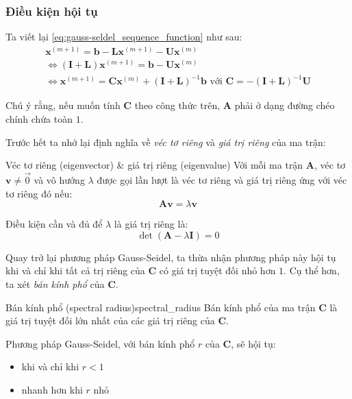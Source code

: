 \documentclass[../../Lectures]{subfiles}
\begin{document}
\subsubsection{Điều kiện hội tụ}

Ta viết lại \eqref{eq:gauss-seldel_sequence_function} như sau:
\begin{gather*}
    \bm{x}^{(m + 1)} = \bm{b} - \bm{L} \bm{x}^{(m + 1)} - \bm{U} \bm{x}^{(m)} \\
    \iff (\bm{I} + \bm{L})\bm{x}^{(m + 1)} = \bm{b} - \bm{U} \bm{x}^{(m)} \\
    \iff \bm{x}^{(m + 1)} = \bm{C} \bm{x}^{(m)} + (\bm{I} + \bm{L})^{-1} \bm{b} \text{ với } \bm{C} = -(\bm{I} + \bm{L})^{-1} \bm{U}
\end{gather*}

Chú ý rằng, nếu muốn tính \(\bm{C}\) theo công thức trên, \(\bm{A}\) phải ở dạng
đường chéo chính chứa toàn \(1\).

Trước hết ta nhớ lại định nghĩa về \emph{véc tơ riêng} và
\emph{giá trị riêng} của ma trận:

\begin{cdefinition}{Véc tơ riêng (eigenvector) \& giá trị riêng (eigenvalue)}{}
    Với mỗi ma trận \(\bm{A}\), véc tơ \(\bm{v} \neq \vec{0}\) và vô hướng
    \(\lambda\) được gọi lần lượt là véc tơ riêng và giá trị riêng ứng với véc
    tơ riêng đó nếu:
    \[\bm{Av} = \lambda \bm{v}\]

    Điều kiện cần và đủ để \(\lambda\) là giá trị riêng là:
    \[\det(\bm{A} - \lambda \bm{I}) = 0\]
\end{cdefinition}

Quay trở lại phương pháp Gauss-Seidel, ta thừa nhận phương pháp này hội tụ khi
và chỉ khi tất cả trị riêng của \(\bm{C}\) có giá trị tuyệt đối nhỏ hơn \(1\).
Cụ thể hơn, ta xét \emph{bán kính phổ} của \(\bm{C}\).

\begin{cdefinition}{Bán kính phổ (spectral radius)}{spectral_radius}
    Bán kính phổ của ma trận \(\bm{C}\) là giá trị tuyệt đối lớn nhất của các
    giá trị riêng của \(\bm{C}\).
\end{cdefinition}

Phương pháp Gauss-Seidel, với bán kính phổ \(r\) của \(\bm{C}\), sẽ hội tụ:
\begin{itemize}
    \item khi và chỉ khi \(r < 1\)
    \item nhanh hơn khi \(r\) nhỏ
\end{itemize}
\end{document}
